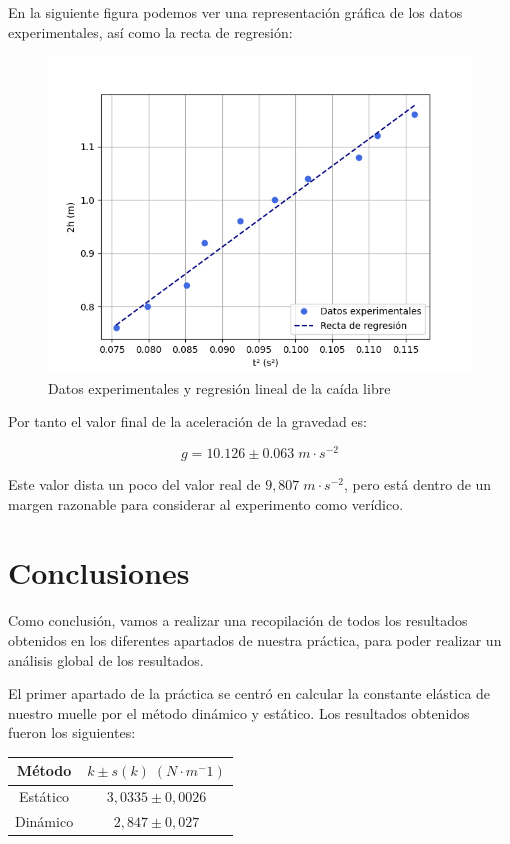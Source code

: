 \documentclass[a4paper,12pt,titlepage]{report}
\begin{document}
En la siguiente figura podemos ver una representación gráfica de los datos experimentales, así como la recta de regresión:

\begin{figure}[h!]
    \centering
    \includegraphics[width=0.75\linewidth]{Images/RegGravedad.png}
    \caption{Datos experimentales y regresión lineal de la caída libre}
\end{figure}

\newpage

Por tanto el valor final de la aceleración de la gravedad es:

\begin{equation}
    g = 10.126 \pm 0.063 \; m \cdot s^{-2}
\end{equation}

Este valor dista un poco del valor real de $9,807 \; m \cdot s^{-2}$, pero está dentro de un margen razonable para considerar al experimento como verídico.

\newpage

\section{Conclusiones}

Como conclusión, vamos a realizar una recopilación de todos los resultados obtenidos en los diferentes apartados de nuestra práctica, para poder realizar un análisis global de los resultados.

\par El primer apartado de la práctica se centró en calcular la constante elástica de nuestro muelle por el método dinámico y estático. Los resultados obtenidos fueron los siguientes:

\begin{table}[h!]
    \centering
    \begin{tabular}{|c|c|}
        \hline
        Método & $k \pm s(k) \; (N\cdot m^-1)$ \\ \hline
        Estático & $3,0335  \pm 0,0026$\\ \hline
        Dinámico & $2,847 \pm 0,027$\\ \hline
    \end{tabular}
\end{table}
\end{document}
